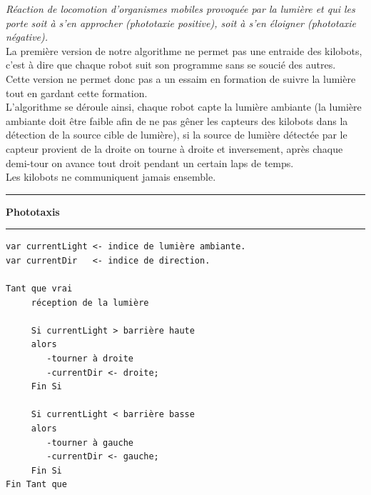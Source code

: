 \documentclass[a4paper,8pt]{report}
\begin{document}
\smallskip
\textit{R\'eaction de locomotion d'organismes mobiles provoqu\'ee par la lumi\`ere et qui les porte soit \`a s'en approcher (phototaxie positive), soit \`a s'en \'eloigner (phototaxie n\'egative).}\\

\smallskip
La premi\`ere version de notre algorithme ne permet pas une entraide des kilobots, c'est \`a dire que chaque robot suit son programme sans se souci\'e des autres.\\
Cette version ne permet donc pas a un essaim en formation de suivre la lumi\`ere tout en gardant cette formation.\\
L'algorithme se d\'eroule ainsi, chaque robot capte la lumi\`ere ambiante (la lumi\`ere ambiante doit \^etre faible afin de ne pas g\^ener les capteurs des kilobots dans la d\'etection de la source cible de lumi\`ere), si la source de lumi\`ere d\'etect\'ee par le capteur provient de la droite on tourne \`a droite et inversement, apr\`es chaque demi-tour on avance tout droit pendant un certain laps de temps.\\
Les kilobots ne communiquent jamais ensemble.\\

\newpage
\begin{center}
  \rule{\linewidth}{.5pt}
  \textbf{Phototaxis}\\
  \rule{\linewidth}{.5pt}
\end{center}

\begin{verbatim}
var currentLight <- indice de lumière ambiante.
var currentDir   <- indice de direction.

Tant que vrai   
     réception de la lumière

     Si currentLight > barrière haute
     alors
        -tourner à droite
        -currentDir <- droite;
     Fin Si
 
     Si currentLight < barrière basse
     alors
        -tourner à gauche
        -currentDir <- gauche;
     Fin Si
Fin Tant que
\end{verbatim}



\end{document}
